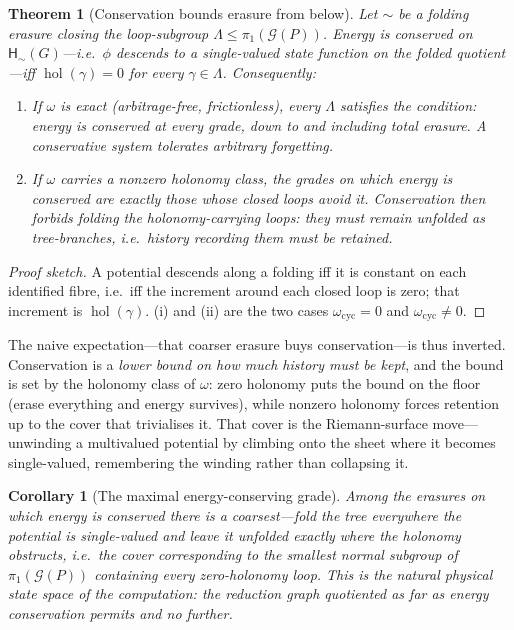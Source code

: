 \documentclass[11pt]{article}
\theoremstyle{definition}
\theoremstyle{plain}
\newtheorem{theorem}[definition]{Theorem}
\newtheorem{corollary}[definition]{Corollary}
\theoremstyle{remark}
\newcommand{\hist}{\mathsf{H}}
\newcommand{\Grph}{\mathcal{G}}
\newcommand{\fund}{\pi_1}
\DeclareMathOperator{\hol}{hol}
\begin{document}
\begin{theorem}[Conservation bounds erasure from below]\label{thm:price}
Let $\sim$ be a folding erasure closing the loop-subgroup $\Lambda\le\fund(\Grph(P))$. Energy is
conserved on $\hist_{\sim}(G)$---i.e.\ $\phi$ descends to a single-valued state function on the
folded quotient---iff $\hol(\gamma)=0$ for every $\gamma\in\Lambda$. Consequently:
\begin{enumerate}[label=\textup{(\roman*)}]
\item If $\omega$ is exact (arbitrage-free, frictionless), every $\Lambda$ satisfies the condition:
energy is conserved at \emph{every} grade, down to and including total erasure. A conservative
system tolerates arbitrary forgetting.
\item If $\omega$ carries a nonzero holonomy class, the grades on which energy is conserved are
exactly those whose closed loops avoid it. Conservation then \emph{forbids} folding the
holonomy-carrying loops: they must remain unfolded as tree-branches, i.e.\ history recording them
must be retained.
\end{enumerate}
\end{theorem}

\begin{proof}[Proof sketch]
A potential descends along a folding iff it is constant on each identified fibre, i.e.\ iff the
increment around each closed loop is zero; that increment is $\hol(\gamma)$. (i) and (ii) are the
two cases $\omega_{\mathrm{cyc}}=0$ and $\omega_{\mathrm{cyc}}\neq0$.
\end{proof}

The naive expectation---that coarser erasure buys conservation---is thus inverted. Conservation is
a \emph{lower bound on how much history must be kept}, and the bound is set by the holonomy class of
$\omega$: zero holonomy puts the bound on the floor (erase everything and energy survives), while
nonzero holonomy forces retention up to the cover that trivialises it. That cover is the
Riemann-surface move---unwinding a multivalued potential by climbing onto the sheet where it becomes
single-valued, remembering the winding rather than collapsing it.

\begin{corollary}[The maximal energy-conserving grade]\label{cor:maximal}
Among the erasures on which energy is conserved there is a coarsest---fold the tree everywhere the
potential is single-valued and leave it unfolded exactly where the holonomy obstructs, i.e.\ the
cover corresponding to the smallest normal subgroup of $\fund(\Grph(P))$ containing every
zero-holonomy loop. This is the natural physical state space of the computation: the reduction
graph quotiented as far as energy conservation permits and no further.
\end{corollary}
\end{document}

